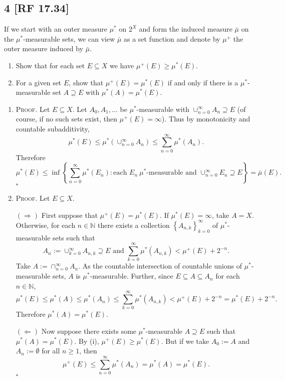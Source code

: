 \documentclass[12pt]{article}
\newcounter{ProofCounter}
\newenvironment{Proof}{\stepcounter{ProofCounter}\textsc{Proof.}}{\hfill$\square$}
\begin{document}
\newpage
\subsection*{4 [RF 17.34]}
\begin{tcolorbox}
If we start with an outer measure $\mu^{*}$ on $2^{X}$ and form the induced measure $\bar{\mu}$ on the $\mu^{*}$-measurable sets, we can view
$\bar{\mu}$ as a set function and denote by $\mu^{+}$ the outer measure induced by $\bar{\mu}$.
\begin{enumerate}[label=(\alph*)]
\item Show that for each set $E \subseteq X$ we have $\mu^{+}(E) \geq \mu^{*}(E)$.
\item For a given set $E$, show that $\mu^{+}(E) = \mu^*(E)$ if and only if there is a $\mu^*$-measurable set $A \supseteq E$ with $\mu^*(A) =
\mu^*(E)$.
\end{enumerate}
\end{tcolorbox}
\begin{enumerate}[label=(\alph*)]
\item \begin{Proof}
Let $E \subseteq X$. Let $A_{0}, A_{1}, \hdots$ be $\mu^*$-measurable with $\cup_{n=0}^{\infty}A_{n}\supseteq E$ (of course, if no such sets exist, then
$\mu^+(E) = \infty$). Thus by monotonicity and countable subadditivity,
\[ \mu^*(E) \leq \mu^*\left( \cup_{n=0}^{\infty}A_{n} \right) \leq \sum_{n=0}^{\infty}\mu^*(A_{n}). \]
Therefore 
\[ \mu^*(E) \leq \inf\left\{ \sum_{n=0}^{\infty}\mu^*(E_{n}) : \text{each }E_{n} \ \mu^{*}\text{-measurable and } \cup_{n=0}^{\infty}E_{n} \supseteq E \right\} =
\bar{\mu}(E). \]
\end{Proof}

\item \begin{Proof}
Let $E \subseteq X$.

$(\Rightarrow)$ First suppose that $\mu^+(E) = \mu^*(E)$. If $\mu^*(E) = \infty$, take $A = X$. Otherwise, for each $n \in \mathbb{N}$ there exists a
collection $\left\{ A_{n,k} \right\}_{k=0}^{\infty}$ of $\mu^*$-measurable sets such that 
\[ A_{n} := \cup_{k=0}^{\infty}A_{n,k} \supseteq E \text{ and } \sum_{k=0}^{\infty}\mu^*(A_{n,k}) < \mu^{+}(E) + 2^{-n}. \]
Take $A := \cap_{n=0}^{\infty}A_{n}$. As the countable intersection of countable unions of
$\mu^*$-measurable sets, $A$ is $\mu^*$-measurable. Further, since $E \subseteq A \subseteq A_{n}$ for each $n \in \mathbb{N}$,
\[ \mu^*(E) \leq \mu^*(A) \leq \mu^*\left( A_{n} \right) \leq \sum_{k=0}^{\infty}\mu^*(A_{n,k}) < \mu^+(E) + 2^{-n} = \mu^*(E) + 2^{-n}. \]
Therefore $\mu^*(A) = \mu^*(E)$.

$(\Leftarrow)$ Now suppose there exists some $\mu^*$-measurable $A \supseteq E$ such that $\mu^*(A) = \mu^*(E)$. By (i), $\mu^+(E) \geq \mu^*(E)$. But
if we take $A_{0} := A$ and $A_{n} := \emptyset$ for all $n \geq 1$, then 
\[ \mu^{+}(E) \leq \sum_{n=0}^{\infty}\mu^{*}(A_{n}) = \mu^*(A) = \mu^*(E). \]
\end{Proof}
\end{enumerate}
\end{document}
